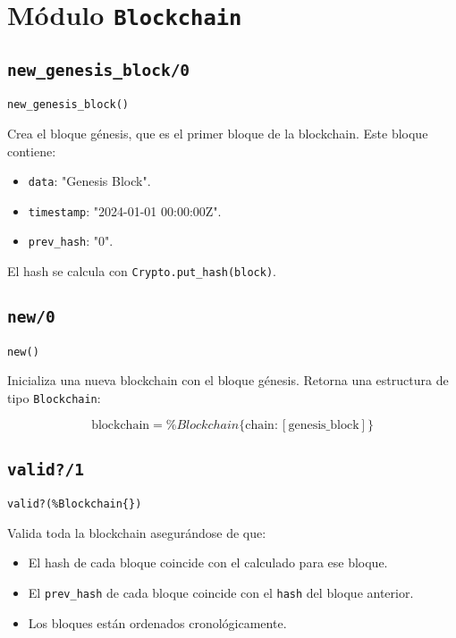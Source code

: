{\section*{Módulo \texttt{Blockchain}}

\subsection*{\texttt{new\_genesis\_block/0}}
\begin{verbatim}
new_genesis_block()
\end{verbatim}

Crea el bloque génesis, que es el primer bloque de la blockchain. Este bloque contiene:

\begin{itemize}
    \item \texttt{data}: "Genesis Block".
    \item \texttt{timestamp}: "2024-01-01 00:00:00Z".
    \item \texttt{prev\_hash}: "0".
\end{itemize}

El hash se calcula con \texttt{Crypto.put\_hash(block)}.

\subsection*{\texttt{new/0}}
\begin{verbatim}
new()
\end{verbatim}

Inicializa una nueva blockchain con el bloque génesis. Retorna una estructura de tipo \texttt{Blockchain}:

\[
\text{blockchain} = \%Blockchain\{\text{chain}: [\text{genesis\_block}]\}
\]

\subsection*{\texttt{valid?/1}}
\begin{verbatim}
valid?(%Blockchain{})
\end{verbatim}

Valida toda la blockchain asegurándose de que:

\begin{itemize}
    \item El hash de cada bloque coincide con el calculado para ese bloque.
    \item El \texttt{prev\_hash} de cada bloque coincide con el \texttt{hash} del bloque anterior.
    \item Los bloques están ordenados cronológicamente.
\end{itemize}

}
